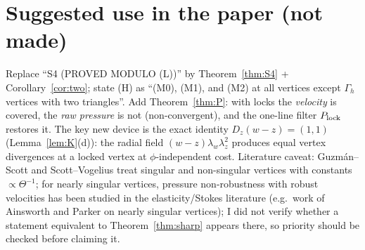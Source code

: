 \documentclass[11pt]{article}
\theoremstyle{remark}
\begin{document}
\section{Suggested use in the paper (not made)}
Replace ``S4 (PROVED MODULO (L))'' by Theorem~\ref{thm:S4} + Corollary~\ref{cor:two}; state (H) as ``(M0), (M1), and (M2) at all
vertices except $\Gamma_h$ vertices with two triangles''. Add Theorem~\ref{thm:P}: with locks the \emph{velocity} is
covered, the \emph{raw pressure} is not (non-convergent), and the one-line filter $P_{\rm lock}$ restores it. The
key new device is the exact identity $D_z(w-z)=(1,1)$ (Lemma~\ref{lem:K}(d)): the radial field
$(w-z)\lambda_w\lambda_z^2$ produces equal vertex divergences at a locked vertex at $\phi$-independent cost.
Literature caveat: Guzm\'an--Scott and Scott--Vogelius treat singular and non-singular vertices with constants
$\propto\Theta^{-1}$; for nearly singular vertices, pressure non-robustness with robust velocities has been studied in
the elasticity/Stokes literature (e.g.\ work of Ainsworth and Parker on nearly singular vertices); I did not verify
whether a statement equivalent to Theorem~\ref{thm:sharp} appears there, so priority should be checked before claiming it.
\end{document}
